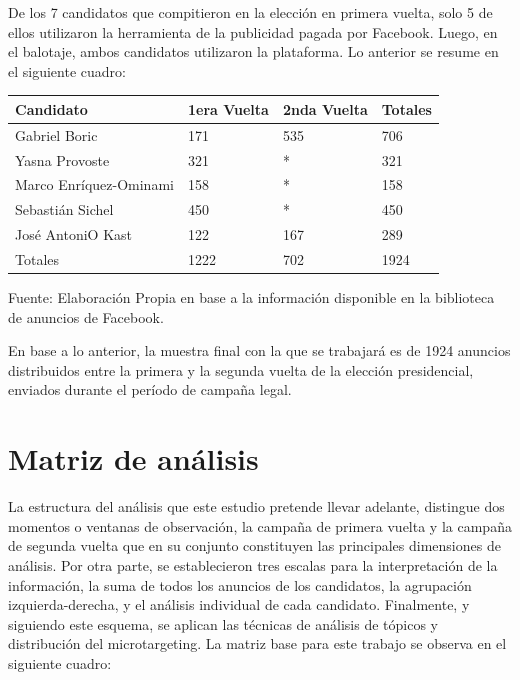 \documentclass[
  10pt,
  letterpaper,
]{report}
\begin{document}
De los 7 candidatos que compitieron en la elección en primera vuelta,
solo 5 de ellos utilizaron la herramienta de la publicidad pagada por
Facebook. Luego, en el balotaje, ambos candidatos utilizaron la
plataforma. Lo anterior se resume en el siguiente cuadro:

\begin{longtable}[]{@{}llll@{}}
\toprule()
Candidato & 1era Vuelta & 2nda Vuelta & Totales \\
\midrule()
\endhead
Gabriel Boric & 171 & 535 & 706 \\
Yasna Provoste & 321 & * & 321 \\
Marco Enríquez-Ominami & 158 & * & 158 \\
Sebastián Sichel & 450 & * & 450 \\
José AntoniO Kast & 122 & 167 & 289 \\
Totales & 1222 & 702 & 1924 \\
\bottomrule()
\end{longtable}

Fuente: Elaboración Propia en base a la información disponible en la
biblioteca de anuncios de Facebook.

En base a lo anterior, la muestra final con la que se trabajará es de
1924 anuncios distribuidos entre la primera y la segunda vuelta de la
elección presidencial, enviados durante el período de campaña legal.

\hypertarget{matriz-de-anuxe1lisis}{%
\section{Matriz de análisis}\label{matriz-de-anuxe1lisis}}

La estructura del análisis que este estudio pretende llevar adelante,
distingue dos momentos o ventanas de observación, la campaña de primera
vuelta y la campaña de segunda vuelta que en su conjunto constituyen las
principales dimensiones de análisis. Por otra parte, se establecieron
tres escalas para la interpretación de la información, la suma de todos
los anuncios de los candidatos, la agrupación izquierda-derecha, y el
análisis individual de cada candidato. Finalmente, y siguiendo este
esquema, se aplican las técnicas de análisis de tópicos y distribución
del microtargeting. La matriz base para este trabajo se observa en el
siguiente cuadro:
\end{document}
